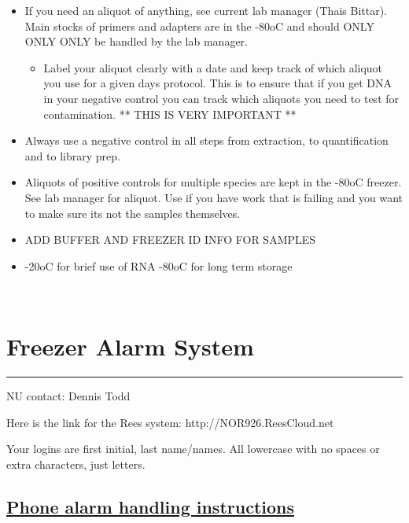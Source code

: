 \documentclass[
  letterpaper,
  DIV=11,
  numbers=noendperiod]{scrreprt}
\providecommand{\tightlist}{%
  \setlength{\itemsep}{0pt}\setlength{\parskip}{0pt}}\usepackage{longtable,booktabs,array}
\begin{document}
\begin{itemize}
\item
  If you need an aliquot of anything, see current lab manager (Thais
  Bittar). Main stocks of primers and adapters are in the -80oC and
  should ONLY ONLY ONLY be handled by the lab manager.

  \begin{itemize}
  \tightlist
  \item
    Label your aliquot clearly with a date and keep track of which
    aliquot you use for a given days protocol. This is to ensure that if
    you get DNA in your negative control you can track which aliquots
    you need to test for contamination. ** THIS IS VERY IMPORTANT **
  \end{itemize}
\item
  Always use a negative control in all steps from extraction, to
  quantification and to library prep.
\item
  Aliquots of positive controls for multiple species are kept in the
  -80oC freezer. See lab manager for aliquot. Use if you have work that
  is failing and you want to make sure its not the samples themselves.
\item
  ADD BUFFER AND FREEZER ID INFO FOR SAMPLES
\item
  -20oC for brief use of RNA -80oC for long term storage\\
  \strut \\
\end{itemize}

\hypertarget{freezer-alarm-system}{%
\chapter{Freezer Alarm System}\label{freezer-alarm-system}}

\begin{center}\rule{0.5\linewidth}{0.5pt}\end{center}

NU contact: Dennis Todd

Here is the link for the Rees system: http://NOR926.ReesCloud.net

Your logins are first initial, last name/names. All lowercase with no
spaces or extra characters, just letters.

\hypertarget{phone-alarm-handling-instructions}{%
\section*{\texorpdfstring{\href{https://drk-lo.github.io/lotterhoslabprotocols/img/PhoneAlarmHandlingInstructionsCentronNUcontactDennisTodd.pdf}{\textbf{Phone
alarm handling
instructions}}}{Phone alarm handling instructions}}\label{phone-alarm-handling-instructions}}
\end{document}
